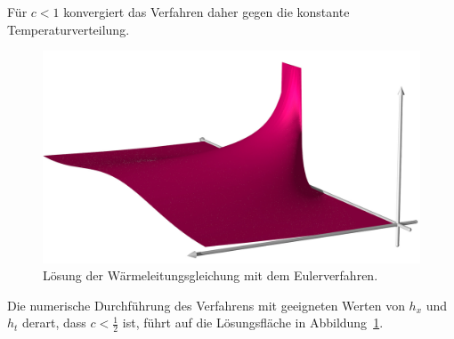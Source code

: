 Für $c<1$ konvergiert das Verfahren daher gegen die konstante
Temperaturverteilung.
\begin{figure}
\centering
\includegraphics[width=\hsize]{chapters/70-pde/images/explizit.jpg}
\caption{Lösung der Wärmeleitungsgleichung mit dem Eulerverfahren.
\label{buch:pde:waerme:figure:euler}}
\end{figure}
Die numerische Durchführung des Verfahrens mit geeigneten Werten von
$h_x$ und $h_t$ derart, dass $c<\frac12$ ist, führt auf die
Lösungsfläche in Abbildung~\ref{buch:pde:waerme:figure:euler}.

